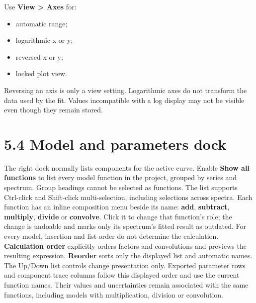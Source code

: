 \documentclass[
  10pt,
  a4paper,
  oneside]{scrreprt}
\providecommand{\tightlist}{%
  \setlength{\itemsep}{0pt}\setlength{\parskip}{0pt}}
\begin{document}
Use \textbf{View \textgreater{} Axes} for:

\begin{itemize}
\tightlist
\item
  automatic range;
\item
  logarithmic x or y;
\item
  reversed x or y;
\item
  locked plot view.
\end{itemize}

Reversing an axis is only a view setting. Logarithmic axes do not
transform the data used by the fit. Values incompatible with a log
display may not be visible even though they remain stored.

\hypertarget{model-and-parameters-dock}{%
\section{5.4 Model and parameters
dock}\label{model-and-parameters-dock}}

The right dock normally lists components for the active curve. Enable
\textbf{Show all functions} to list every model function in the project,
grouped by series and spectrum. Group headings cannot be selected as
functions. The list supports Ctrl-click and Shift-click multi-selection,
including selections across spectra. Each function has an inline
composition menu beside its name: \textbf{add}, \textbf{subtract},
\textbf{multiply}, \textbf{divide} or \textbf{convolve}. Click it to
change that function's role; the change is undoable and marks only its
spectrum's fitted result as outdated. For every model, insertion and
list order do not determine the calculation. \textbf{Calculation order}
explicitly orders factors and convolutions and previews the resulting
expression. \textbf{Reorder} sorts only the displayed list and automatic
names. The Up/Down list controls change presentation only. Exported
parameter rows and component trace columns follow this displayed order
and use the current function names. Their values and uncertainties
remain associated with the same functions, including models with
multiplication, division or convolution.
\end{document}
